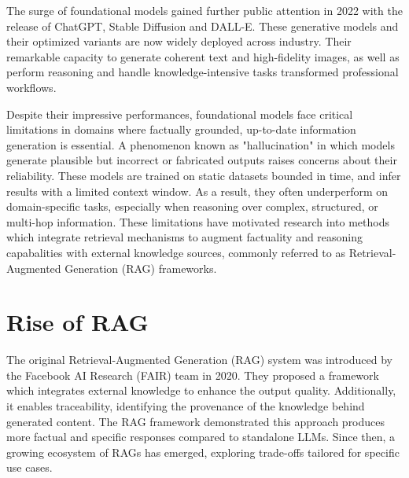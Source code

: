 \documentclass[12pt,twoside]{report}
\begin{document}
The surge of foundational models\cite{FoundationModels} gained further public attention in 2022 with the release of ChatGPT\cite{IntroducingChatGPT}, Stable Diffusion\cite{StableDiffusion} and DALL-E\cite{DALL.E-2}. These generative models and their optimized variants are now widely deployed across industry. Their remarkable capacity to generate coherent text and high-fidelity images, as well as perform reasoning and handle knowledge-intensive tasks transformed professional workflows\cite{FoundationModelsInBigBusiness}.

Despite their impressive performances, foundational models face critical limitations in domains where factually grounded, up-to-date information generation is essential. A phenomenon known as "hallucination"\cite{Hallucinations} in which models generate plausible but incorrect or fabricated outputs raises concerns about their reliability. These models are trained on static datasets bounded in time, and infer results with a limited context window. As a result, they often underperform on domain-specific tasks, especially when reasoning over complex, structured, or multi-hop information\cite{ReasoningOrReciting}. These limitations have motivated research into methods which integrate retrieval mechanisms to augment factuality and reasoning capabalities with external knowledge sources, commonly referred to as Retrieval-Augmented Generation (RAG) frameworks.

\section{Rise of RAG}
The original Retrieval-Augmented Generation (RAG) system was introduced by the Facebook AI Research (FAIR) team in 2020\cite{FAIRRAG}. They proposed a framework which integrates external knowledge to enhance the output quality. Additionally, it enables traceability, identifying the provenance of the knowledge behind generated content. The RAG framework demonstrated this approach produces more factual and specific responses compared to standalone LLMs. Since then, a growing ecosystem of RAGs has emerged\cite{RAGSurvey}, exploring trade-offs tailored for specific use cases.
\end{document}
